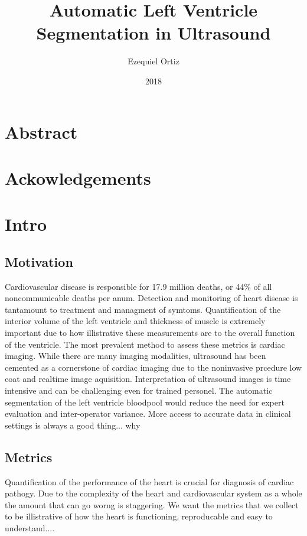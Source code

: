 \documentclass{article}
\title{Automatic Left Ventricle Segmentation in Ultrasound}
\date{2018}
\author{Ezequiel Ortiz}
\begin{document}
\maketitle
{}
\newpage
{}
\section{Abstract}
\section{Ackowledgements}
\section{Intro}
\subsection{Motivation}
Cardiovascular disease is responsible for 17.9 million deaths, or 44\% of all noncommunicable deaths per anum\cite{who_world_health}.
Detection and monitoring of heart disease is tantamount to treatment and managment of symtoms.%
Quantification of the interior volume of the left ventricle and thickness of muscle is extremely important due to how illistrative these measurements are to the overall function of the ventricle.\cite{ase_chamber_quant}
The most prevalent method to assess these metrics is cardiac imaging.
While there are many imaging modalities, ultrasound has been cemented as a cornerstone of cardiac imaging due to the noninvasive prcedure low coat and realtime image aquisition.
Interpretation of ultrasound images is time intensive and can be challenging even for trained personel.
The automatic segmentation of the left ventricle bloodpool %
would reduce the need for expert evaluation and inter-operator variance.%
More access to accurate data in clinical settings is always a good thing... why

\subsection{Metrics}
Quantification of the performance of the heart is crucial for diagnosis of cardiac pathogy.
Due to the complexity of the heart and cardiovascular system as a whole the amount that can go worng is staggering.
We want the metrics that we collect to be illistrative of how the heart is functioning,
reproducable
and easy to understand....%
\end{document}
